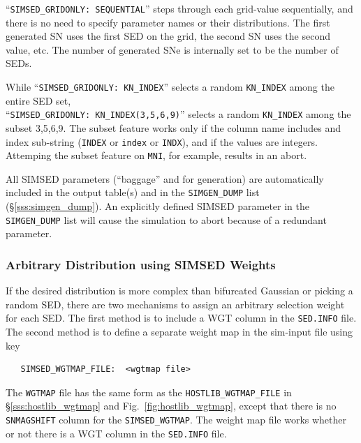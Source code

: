 \documentclass[12pt]{article}
\begin{document}
\medskip
``{\tt SIMSED\_GRIDONLY: SEQUENTIAL}''
steps through each grid-value sequentially,
and  there is no need to specify parameter names or their distributions.
The first generated SN  uses the first SED on the grid, 
the second SN uses the second value, etc.  
The number of generated SNe is internally set to be the 
number of SEDs.

While ``{\tt SIMSED\_GRIDONLY: KN\_INDEX}'' selects a random 
{\tt KN\_INDEX} among the entire SED set, \\
``{\tt SIMSED\_GRIDONLY: KN\_INDEX(3,5,6,9)}'' selects a random 
{\tt KN\_INDEX} among the subset 3,5,6,9. 
The subset feature works only if the column name includes
and index sub-string ({\tt INDEX} or {\tt index} or {\tt INDX}),
and if the values are integers. Attemping the subset feature on
{\tt MNI}, for example, results in an abort.

All SIMSED parameters (``baggage'' and for generation)
are automatically included in the output table(s) and
in the {\tt SIMGEN\_DUMP} list (\S\ref{sss:simgen_dump}).
An explicitly defined SIMSED parameter in the {\tt SIMGEN\_DUMP} 
list will cause the simulation to abort because of a redundant parameter.


\subsubsection{Arbitrary Distribution using SIMSED Weights}
\label{sss:simsed_wgt}

If the desired distribution is more complex than bifurcated Gaussian
or picking a random SED, there are two mechanisms to assign an arbitrary
selection weight for each SED. The first method is to include a WGT column
in the {\tt SED.INFO} file. The second method is to define a separate
weight map in the sim-input file using key
\begin{verbatim}
   SIMSED_WGTMAP_FILE:  <wgtmap file>
\end{verbatim}
The {\tt WGTMAP} file has the same form as the {\tt HOSTLIB\_WGTMAP\_FILE}
in \S\ref{sss:hostlib_wgtmap} and Fig.~\ref{fig:hostlib_wgtmap},
except that there is no {\tt SNMAGSHIFT} column for the {\tt SIMSED\_WGTMAP}.
The weight map file works whether or not there is a WGT column in the
{\tt SED.INFO} file.
\end{document}
